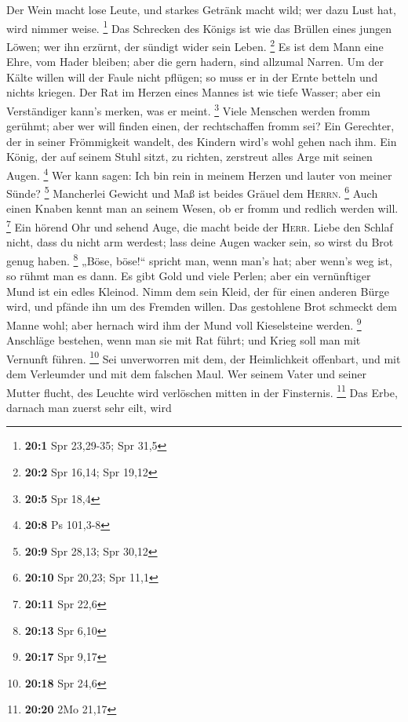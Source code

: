  Der Wein macht lose Leute, und starkes Getränk macht
wild; wer dazu Lust hat, wird nimmer weise. \footnote{\textbf{20:1} Spr
  23,29-35; Spr 31,5}  Das Schrecken des Königs ist wie
das Brüllen eines jungen Löwen; wer ihn erzürnt, der sündigt wider sein
Leben. \footnote{\textbf{20:2} Spr 16,14; Spr 19,12}  Es
ist dem Mann eine Ehre, vom Hader bleiben; aber die gern hadern, sind
allzumal Narren.  Um der Kälte willen will der Faule nicht
pflügen; so muss er in der Ernte betteln und nichts kriegen.
 Der Rat im Herzen eines Mannes ist wie tiefe Wasser; aber
ein Verständiger kann's merken, was er meint. \footnote{\textbf{20:5}
  Spr 18,4}  Viele Menschen werden fromm gerühmt; aber wer
will finden einen, der rechtschaffen fromm sei?  Ein
Gerechter, der in seiner Frömmigkeit wandelt, des Kindern wird's wohl
gehen nach ihm.  Ein König, der auf seinem Stuhl sitzt, zu
richten, zerstreut alles Arge mit seinen Augen. \footnote{\textbf{20:8}
  Ps 101,3-8}  Wer kann sagen: Ich bin rein in meinem
Herzen und lauter von meiner Sünde? \footnote{\textbf{20:9} Spr 28,13;
  Spr 30,12}  Mancherlei Gewicht und Maß ist beides
Gräuel dem \textsc{Herrn}. \footnote{\textbf{20:10} Spr 20,23; Spr 11,1}
 Auch einen Knaben kennt man an seinem Wesen, ob er fromm
und redlich werden will. \footnote{\textbf{20:11} Spr 22,6}
 Ein hörend Ohr und sehend Auge, die macht beide der
\textsc{Herr}.  Liebe den Schlaf nicht, dass du nicht arm
werdest; lass deine Augen wacker sein, so wirst du Brot genug haben.
\footnote{\textbf{20:13} Spr 6,10}  „Böse, böse!{}``
spricht man, wenn man's hat; aber wenn's weg ist, so rühmt man es dann.
 Es gibt Gold und viele Perlen; aber ein vernünftiger
Mund ist ein edles Kleinod.  Nimm dem sein Kleid, der für
einen anderen Bürge wird, und pfände ihn um des Fremden willen.
 Das gestohlene Brot schmeckt dem Manne wohl; aber
hernach wird ihm der Mund voll Kieselsteine werden. \footnote{\textbf{20:17}
  Spr 9,17}  Anschläge bestehen, wenn man sie mit Rat
führt; und Krieg soll man mit Vernunft führen. \footnote{\textbf{20:18}
  Spr 24,6}  Sei unverworren mit dem, der Heimlichkeit
offenbart, und mit dem Verleumder und mit dem falschen Maul.
 Wer seinem Vater und seiner Mutter flucht, des Leuchte
wird verlöschen mitten in der Finsternis. \footnote{\textbf{20:20} 2Mo
  21,17}  Das Erbe, darnach man zuerst sehr eilt, wird
